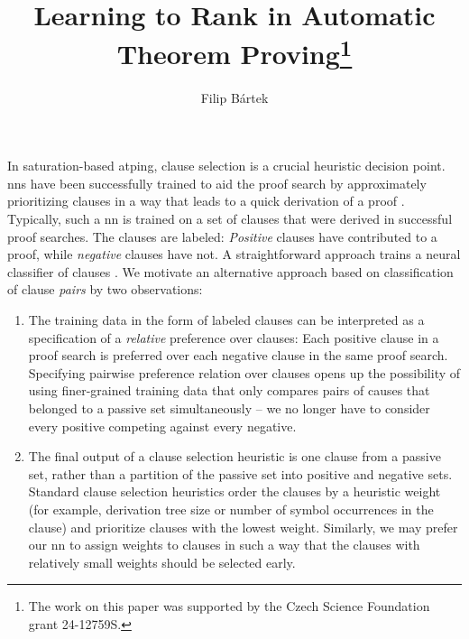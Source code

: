 \documentclass{easychair}
\title{Learning to Rank in Automatic Theorem Proving\thanks{The work on this paper was supported by the Czech Science Foundation grant 24-12759S.}}
\author{Filip Bártek}
\institute{\href{https://www.cvut.cz/}{\acrlong{ctu}}, Czech Republic\\
\email{filip.bartek@cvut.cz}}
\begin{document}
\maketitle

In saturation-based \gls{atping},
clause selection is a crucial heuristic decision point.
\Glspl{nn} have been successfully trained to aid the proof search by approximately prioritizing clauses
in a way that leads to a quick derivation of a proof \cite{DBLP:conf/lpar/Bartek023,DBLP:conf/cade/JakubuvCOP0U20,DBLP:conf/cade/ChvalovskyJ0U19,DBLP:conf/cade/000121a,DBLP:conf/lpar/ChvalovskyKPU23}.
Typically, such a \gls{nn} is trained on a set of clauses that were derived in successful proof searches.
The clauses are labeled: \emph{Positive} clauses have contributed to a proof, while \emph{negative} clauses have not.
A straightforward approach trains a neural classifier of clauses \cite{DBLP:conf/cade/JakubuvCOP0U20,DBLP:conf/cade/000121a}.
We motivate an alternative approach based on classification of clause \emph{pairs} by two observations:

\begin{enumerate}
\item
The training data in the form of labeled clauses
can be interpreted as a specification of a \emph{relative} preference over clauses:
Each positive clause in a proof search is preferred over each negative clause in the same proof search.
Specifying pairwise preference relation over clauses opens up the possibility of using finer-grained training data
that only compares pairs of causes that belonged to a passive set simultaneously --
we no longer have to consider every positive competing against every negative.

\item
The final output of a clause selection heuristic is one clause from a passive set,
rather than a partition of the passive set into positive and negative sets.
Standard clause selection heuristics order the clauses by a heuristic weight
(for example, derivation tree size or number of symbol occurrences in the clause)
and prioritize clauses with the lowest weight.
Similarly, we may prefer our \gls{nn} to assign weights to clauses in such a way that
the clauses with relatively small weights should be selected early.
\end{enumerate}
\end{document}
